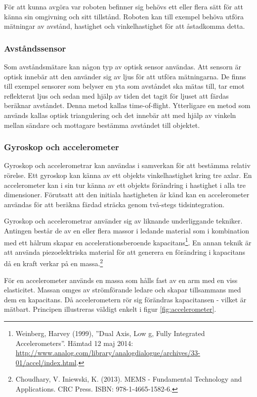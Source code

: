 \documentclass[a4paper,12pt,fleqn]{article}
\begin{document}
För att kunna avgöra var roboten befinner sig behövs ett eller flera sätt för att känna sin omgivning och sitt tillstånd. Roboten kan till exempel behöva utföra mätningar av avstånd, hastighet och vinkelhastighet för att åstadkomma detta. 

\subsubsection{Avståndssensor}

Som avståndsmätare kan någon typ av optisk sensor användas. Att sensorn är optisk innebär att den använder sig av ljus för att utföra mätningarna. De finns till exempel sensorer som belyser en yta som avståndet ska mätas till, tar emot reflekterat ljus och sedan med hjälp av tiden det tagit för ljuset att färdas beräknar avståndet. Denna metod kallas time-of-flight. Ytterligare en metod som används kallas optisk triangulering och det innebär att med hjälp av vinkeln mellan sändare och mottagare bestämma avståndet till objektet.
\newpage

\subsubsection{Gyroskop och accelerometer}

Gyroskop och accelerometrar kan användas i samverkan för att bestämma relativ rörelse. Ett gyroskop kan känna av ett objekts vinkelhastighet kring tre axlar. En accelerometer kan i sin tur känna av ett objekts förändring i hastighet i alla tre dimensioner. Förutsatt att den initiala hastigheten är känd kan en accelerometer användas för att beräkna färdad sträcka genom två-stegs tidsintegration. 

Gyroskop och accelerometrar använder sig av liknande underliggande tekniker. Antingen består de av en eller flera massor i ledande material som i kombination med ett hålrum skapar en accelerationsberoende kapacitans\footnote{Weinberg, Harvey (1999), ''Dual Axis, Low g, Fully Integrated Accelerometers''. Hämtad 12 maj 2014: \url{http://www.analog.com/library/analogdialogue/archives/33-01/accel/index.html}.}. En annan teknik är att använda piezoelektriska material för att generera en förändring i kapacitans då en kraft verkar på en massa.\footnote{Choudhary, V. Iniewski, K. (2013). MEMS - Fundamental Technology and Applications. CRC Press. ISBN: 978-1-4665-1582-6.} 

För en accelerometer används en massa som hålls fast av en arm med en viss elasticitet. Massan omges av strömförande ledare och skapar tillsammans med dem en kapacitans. Då accelerometern rör sig förändras kapacitansen - vilket är mätbart. Principen illustreras väldigt enkelt i figur \ref{fig:accelerometer}.
\end{document}
